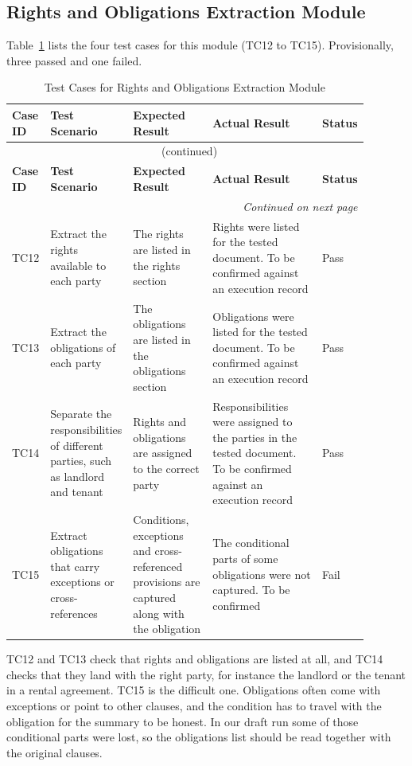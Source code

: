 \documentclass[12pt,a4paper,oneside]{report}
\begin{document}
\subsection{Rights and Obligations Extraction Module}
Table~\ref{tab:rights} lists the four test cases for this module (TC12 to TC15). Provisionally, three passed and one failed.
{\footnotesize
\setlength{\tabcolsep}{3pt}
\renewcommand{\arraystretch}{1.15}
\begin{longtable}{|p{0.075\linewidth}|p{0.19\linewidth}|p{0.23\linewidth}|p{0.32\linewidth}|p{0.08\linewidth}|}
\caption{Test Cases for Rights and Obligations Extraction Module}\label{tab:rights}\\
\hline
\textbf{Case ID} & \textbf{Test Scenario} & \textbf{Expected Result} & \textbf{Actual Result} & \textbf{Status}\\
\hline
\endfirsthead
\multicolumn{5}{c}{\tablename~\thetable{} (continued)}\\
\hline
\textbf{Case ID} & \textbf{Test Scenario} & \textbf{Expected Result} & \textbf{Actual Result} & \textbf{Status}\\
\hline
\endhead
\hline
\multicolumn{5}{r}{\emph{Continued on next page}}\\
\endfoot
\hline
\endlastfoot
TC12 & Extract the rights available to each party & The rights are listed in the rights section & Rights were listed for the tested document. To be confirmed against an execution record & Pass\\
\hline
TC13 & Extract the obligations of each party & The obligations are listed in the obligations section & Obligations were listed for the tested document. To be confirmed against an execution record & Pass\\
\hline
TC14 & Separate the responsibilities of different parties, such as landlord and tenant & Rights and obligations are assigned to the correct party & Responsibilities were assigned to the parties in the tested document. To be confirmed against an execution record & Pass\\
\hline
TC15 & Extract obligations that carry exceptions or cross-references & Conditions, exceptions and cross-referenced provisions are captured along with the obligation & The conditional parts of some obligations were not captured. To be confirmed & Fail\\
\end{longtable}
}

TC12 and TC13 check that rights and obligations are listed at all, and TC14 checks that they land with the right party, for instance the landlord or the tenant in a rental agreement. TC15 is the difficult one. Obligations often come with exceptions or point to other clauses, and the condition has to travel with the obligation for the summary to be honest. In our draft run some of those conditional parts were lost, so the obligations list should be read together with the original clauses.
\end{document}
